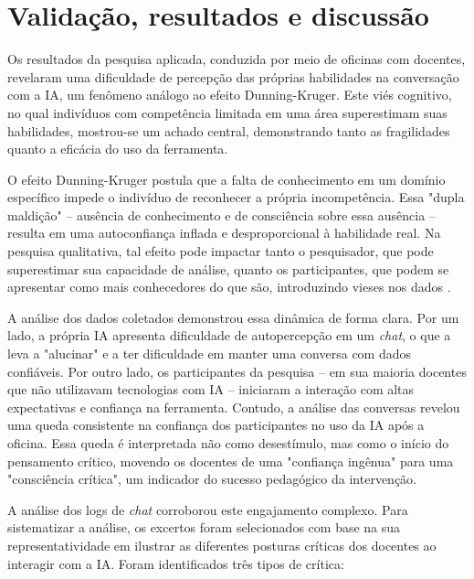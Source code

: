 \documentclass[portuguese]{textolivre}
\begin{document}
\section{Validação, resultados e discussão}\label{sec-resumo}
Os resultados da pesquisa aplicada, conduzida por meio de oficinas com docentes, revelaram uma dificuldade de percepção das próprias habilidades na conversação com a IA, um fenômeno análogo ao efeito Dunning-Kruger. Este viés cognitivo, no qual indivíduos com competência limitada em uma área superestimam suas habilidades, mostrou-se um achado central, demonstrando tanto as fragilidades quanto a eficácia do uso da ferramenta.

O efeito Dunning-Kruger \cite{kruger1999unskilled} postula que a falta de conhecimento em um domínio específico impede o indivíduo de reconhecer a própria incompetência. Essa "dupla maldição" – ausência de conhecimento e de consciência sobre essa ausência – resulta em uma autoconfiança inflada e desproporcional à habilidade real. Na pesquisa qualitativa, tal efeito pode impactar tanto o pesquisador, que pode superestimar sua capacidade de análise, quanto os participantes, que podem se apresentar como mais conhecedores do que são, introduzindo vieses nos dados \cite{longweni2025managerial}.

A análise dos dados coletados demonstrou essa dinâmica de forma clara. Por um lado, a própria IA apresenta dificuldade de autopercepção em um \textit{chat}, o que a leva a "alucinar" e a ter dificuldade em manter uma conversa com dados confiáveis. Por outro lado, os participantes da pesquisa – em sua maioria docentes que não utilizavam tecnologias com IA – iniciaram a interação com altas expectativas e confiança na ferramenta. Contudo, a análise das conversas revelou uma queda consistente na confiança dos participantes no uso da IA após a oficina. Essa queda é interpretada não como desestímulo, mas como o início do pensamento crítico, movendo os docentes de uma "confiança ingênua" para uma "consciência crítica", um indicador do sucesso pedagógico da intervenção.

A análise dos logs de \textit{chat} corroborou este engajamento complexo. Para sistematizar a análise, os excertos foram selecionados com base na sua representatividade em ilustrar as diferentes posturas críticas dos docentes ao interagir com a IA. Foram identificados três tipos de crítica:
\end{document}
